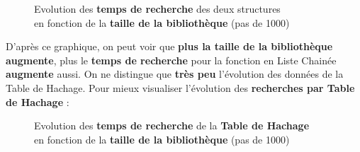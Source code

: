 \documentclass[12pt]{extarticle}
\begin{document}
\begin{center}
\begin{figure}[h] %
  \centering %
  \captionsetup{justification=centering} %
  \caption{Evolution des \textbf{temps de recherche} des deux structures \\ en fonction de la \textbf{taille de la bibliothèque} (pas de 1000)} %
  \label{fig:exemple} %
\end{figure}
\end{center}
D'après ce graphique, on peut voir que \textbf{plus la taille de la bibliothèque augmente}, plus le \textbf{temps de recherche} pour la fonction en Liste Chainée\textbf{ augmente} aussi. On ne distingue que \textbf{très peu} l'évolution des données de la Table de Hachage.\newpage
Pour mieux visualiser l'évolution des \textbf{recherches par Table de Hachage} :
\begin{center}
\begin{figure}[h] %
  \centering %
  \captionsetup{justification=centering} %
  \caption{Evolution des \textbf{temps de recherche} de la \textbf{Table de Hachage} \\ en fonction de la \textbf{taille de la bibliothèque} (pas de 1000)} %
  \label{fig:exemple} %
\end{figure}
\end{center} 
\end{document}
